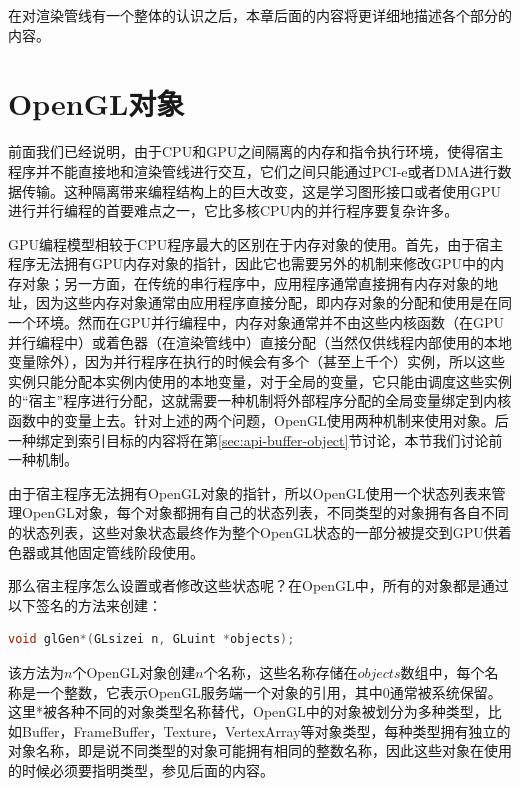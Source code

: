在对渲染管线有一个整体的认识之后，本章后面的内容将更详细地描述各个部分的内容。





\section{OpenGL对象}\label{sec:api-opengl-object}
前面我们已经说明，由于CPU和GPU之间隔离的内存和指令执行环境，使得宿主程序并不能直接地和渲染管线进行交互，它们之间只能通过PCI-e或者DMA进行数据传输。这种隔离带来编程结构上的巨大改变，这是学习图形接口或者使用GPU进行并行编程的首要难点之一，它比多核CPU内的并行程序要复杂许多。

GPU编程模型相较于CPU程序最大的区别在于内存对象的使用。首先，由于宿主程序无法拥有GPU内存对象的指针，因此它也需要另外的机制来修改GPU中的内存对象；另一方面，在传统的串行程序中，应用程序通常直接拥有内存对象的地址，因为这些内存对象通常由应用程序直接分配，即内存对象的分配和使用是在同一个环境。然而在GPU并行编程中，内存对象通常并不由这些内核函数（在GPU并行编程中）或着色器（在渲染管线中）直接分配（当然仅供线程内部使用的本地变量除外），因为并行程序在执行的时候会有多个（甚至上千个）实例，所以这些实例只能分配本实例内使用的本地变量，对于全局的变量，它只能由调度这些实例的“宿主”程序进行分配，这就需要一种机制将外部程序分配的全局变量绑定到内核函数中的变量上去。针对上述的两个问题，OpenGL使用两种机制来使用对象。后一种绑定到索引目标的内容将在第\ref{sec:api-buffer-object}节讨论，本节我们讨论前一种机制。

由于宿主程序无法拥有OpenGL对象的指针，所以OpenGL使用一个状态列表来管理OpenGL对象，每个对象都拥有自己的状态列表，不同类型的对象拥有各自不同的状态列表，这些对象状态最终作为整个OpenGL状态的一部分被提交到GPU供着色器或其他固定管线阶段使用。

那么宿主程序怎么设置或者修改这些状态呢？在OpenGL中，所有的对象都是通过以下签名的方法来创建：

\begin{lstlisting}[language=C++]
void glGen*(GLsizei n​, GLuint *objects​);
\end{lstlisting}

该方法为$n$个OpenGL对象创建$n$个名称，这些名称存储在$objects$数组中，每个名称是一个整数，它表示OpenGL服务端一个对象的引用，其中0通常被系统保留。这里*被各种不同的对象类型名称替代，OpenGL中的对象被划分为多种类型，比如Buffer，FrameBuffer，Texture，VertexArray等对象类型，每种类型拥有独立的对象名称，即是说不同类型的对象可能拥有相同的整数名称，因此这些对象在使用的时候必须要指明类型，参见后面的内容。
	

